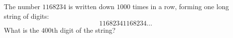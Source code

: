 The number $1168234$ is written down $1000$ times in a row, forming one long string of digits:\[11682341168234\ldots\]What is the $400$th digit of the string?
